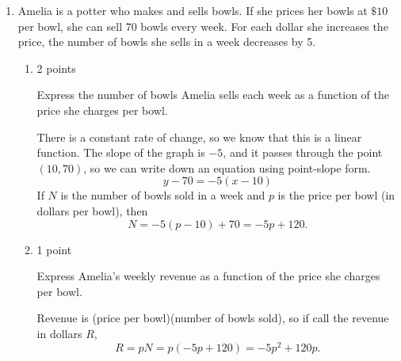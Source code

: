 \documentclass{article}
\begin{document}
\begin{enumerate}
\begin{enumerate}
\begin{solution}
      Therefore the domain is $8\leq r \leq \frac{100}{\pi}$.
    \end{solution}

  \end{enumerate}

\item %

  Amelia is a potter who makes and sells bowls. If she prices her bowls at $\$10$ per bowl, she can sell 70 bowls every week. For each dollar she increases the price, the number of bowls she sells in a week decreases by 5. 

  \begin{enumerate}

  \item

    \begin{grading}
      2 points
    \end{grading}

    \begin{problem}[\stretch{0.75}]
      Express the number of bowls Amelia sells each week as a function of the price she charges per bowl. 
    \end{problem}

    \begin{solution}
      There is a constant rate of change,
      so we know that this is a linear function. The slope of the graph is $-5$, and it
      passes through the point $(10, 70)$, so we can write down an equation
      using point-slope form.
      \[y - 70= -5(x-10) \]
      If $N$ is the number of bowls sold in a week and $p$ is the price per bowl 
      (in dollars per bowl), then
        \[N = -5(p-10)+70
        = -5p + 120.\]
    \end{solution}

  \item \label{6.4.9-revenue}

    \begin{grading}
      1 point
    \end{grading}

    \begin{problem}[\stretch{0.75}]
      Express Amelia's weekly revenue as a function of the price she charges per bowl. 
    \end{problem}

    \begin{solution} 
      Revenue is (price per bowl)(number of bowls sold), so if call the
      revenue in dollars $R$,
      \[R=pN=p(-5p+120)=-5p^2+120p.\]
    \end{solution}


\end{enumerate}
\end{enumerate}
\end{document}
